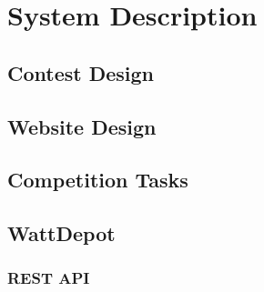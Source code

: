 \chapter{System Description}
\label{cha:system-description}

\section{Contest Design}

\section{Website Design}

\section{Competition Tasks}

\section{WattDepot}

\subsection{REST API}
